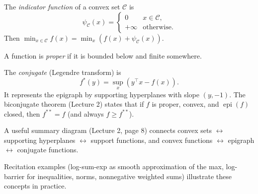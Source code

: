The \emph{indicator function} of a convex set $\mathcal{C}$ is
\[
\psi_{\mathcal{C}}(x)=
\begin{cases}0 & x\in\mathcal{C},\\+\infty & \text{otherwise.}
\end{cases}
\]
Then $\min_{x\in\mathcal{C}}f(x)=\min_x(f(x)+\psi_{\mathcal{C}}(x))$.

A function is \emph{proper} if it is bounded below and finite somewhere.

The \emph{conjugate} (Legendre transform) is
\[
f^*(y)=\sup_x(y^\top x-f(x)).
\]
It represents the epigraph by supporting hyperplanes with slope
$(y,-1)$. The biconjugate theorem (Lecture 2) states that if $f$ is
proper, convex, and $\operatorname{epi}(f)$ closed, then $f^{**}=f$
(and always $f\ge f^{**}$).

A useful summary diagram (Lecture 2, page 8) connects convex sets
$\leftrightarrow$ supporting hyperplanes $\leftrightarrow$ support
functions, and convex functions $\leftrightarrow$ epigraph
$\leftrightarrow$ conjugate functions.

Recitation examples (log-sum-exp as smooth approximation of the max,
log-barrier for inequalities, norms, nonnegative weighted sums)
illustrate these concepts in practice.

